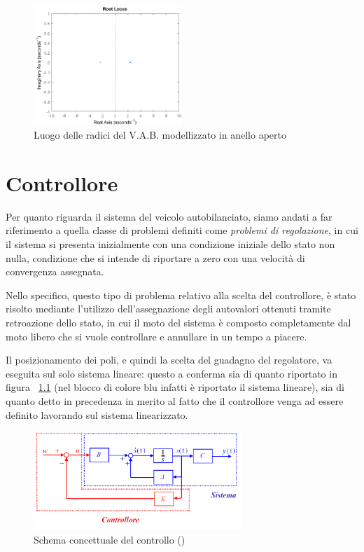 \begin{figure}[H]
	\centering   	
	\includegraphics[width=0.5\textwidth]{Immagini/root_locus_open_loop.png}
	\caption{Luogo delle radici del V.A.B. modellizzato in anello aperto}
	\label{fig:r_locus_openloop}
\end{figure}

\chapter{Controllore}
Per quanto riguarda il sistema del veicolo autobilanciato, siamo andati a far riferimento a quella classe di problemi definiti come \textit{problemi di regolazione}, in cui il sistema si presenta inizialmente con una condizione iniziale dello stato non nulla, condizione che si intende di riportare a zero con una velocità di convergenza assegnata.

Nello specifico, questo tipo di problema relativo alla scelta del controllore, è stato risolto mediante l'utilizzo dell'assegnazione degli autovalori ottenuti tramite retroazione dello stato, in cui il moto del sistema è composto completamente dal moto libero che si vuole controllare e annullare in un tempo a piacere.

Il posizionamento dei poli, e quindi la scelta del guadagno del regolatore, va eseguita sul solo sistema lineare: questo a conferma sia di quanto riportato in figura ~\ref{fig:feedback_state} (nel blocco di colore blu infatti è riportato il sistema lineare), sia di quanto detto in precedenza in merito al fatto che il controllore venga ad essere definito lavorando sul sistema linearizzato.

\begin{figure}[H]
	\centering   	
	\includegraphics[width=0.70\textwidth]{Immagini/feedback_state.png}
	\caption{Schema concettuale del controllo (\cite{feedback_state})}
	\label{fig:feedback_state}
\end{figure}

